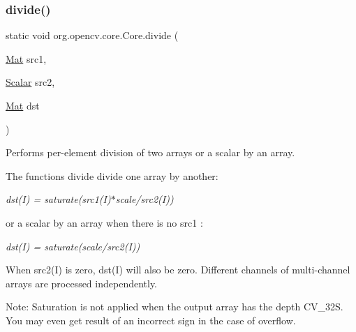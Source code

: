 \subsubsection{\texorpdfstring{divide()}{divide()}\hspace{0.1cm}{\footnotesize\ttfamily [8/8]}}
{\footnotesize\ttfamily static void org.\+opencv.\+core.\+Core.\+divide (\begin{DoxyParamCaption}\item[{\mbox{\hyperlink{classorg_1_1opencv_1_1core_1_1_mat}{Mat}}}]{src1,  }\item[{\mbox{\hyperlink{classorg_1_1opencv_1_1core_1_1_scalar}{Scalar}}}]{src2,  }\item[{\mbox{\hyperlink{classorg_1_1opencv_1_1core_1_1_mat}{Mat}}}]{dst }\end{DoxyParamCaption})\hspace{0.3cm}{\ttfamily [static]}}

Performs per-\/element division of two arrays or a scalar by an array.

The functions {\ttfamily divide} divide one array by another\+:

{\itshape dst(\+I) = saturate(src1(\+I)$\ast$scale/src2(I))}

or a scalar by an array when there is no {\ttfamily src1} \+:

{\itshape dst(\+I) = saturate(scale/src2(I))}

When {\ttfamily src2(\+I)} is zero, {\ttfamily dst(\+I)} will also be zero. Different channels of multi-\/channel arrays are processed independently.

Note\+: Saturation is not applied when the output array has the depth {\ttfamily C\+V\+\_\+32S}. You may even get result of an incorrect sign in the case of overflow.



